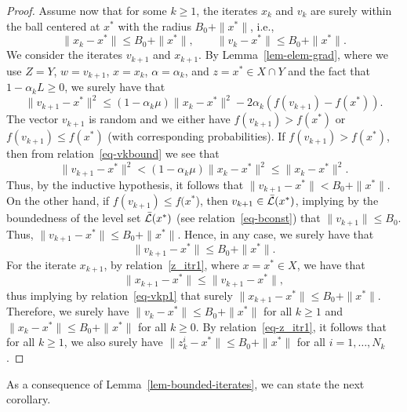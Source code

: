 \documentclass{article}
\def\a{\alpha}
\theoremstyle{plain}
\theoremstyle{definition}
\theoremstyle{remark}
\begin{document}
\begin{proof}
    Assume now that for some $k\ge 1$, the iterates $x_k$ and $v_k$ are surely within the ball centered at $x^*$ with the radius $B_0+\|x^*\|$, i.e.,
    \[\|x_k-x^*\|\le B_0+\|x^*\|,\qquad 
    \|v_k-x^*\|\le B_0+\|x^*\|.\]
    We consider the iterates $v_{k+1}$ and $x_{k+1}$.
    By Lemma~\ref{lem-elem-grad}, where we use 
    $Z=Y$, $w=v_{k+1}$, $x=x_k$, $\a=\a_k$, and $z=x^*\in X \cap Y $ and the fact that $1-\a_k L\ge0$, we surely have that 
    \begin{equation}\label{eq-vkbound}
    \|v_{k+1} - x^*\|^2 \leq (1-\a_k \mu) \| x_{k} -x^*\|^2  - 2 \a_k (f(v_{k+1}) - f(x^*)).
     \end{equation}
    The vector $v_{k+1}$ is random and we either have 
    $f(v_{k+1})> f(x^*)$ or $f(v_{k+1})\le f(x^*)$ (with corresponding probabilities).
    If $f(v_{k+1})> f(x^*)$, then 
    from relation~\eqref{eq-vkbound} we see that 
    \[\|v_{k+1} - x^*\|^2 <(1-\a_k \mu) \| x_{k} -x^*\|^2 \le \|x_k-x^*\|^2.\]
    Thus, by the inductive hypothesis, it follows that
    $\|v_{k+1}-x^*\|< B_0+\|x^*\|$. 
    On the other hand, 
    if $f(v_{k+1})\le f(x^*$), then $v_{k+1}\in {\cal \bar L}(x^*)$, implying by the boundedness of the level set ${\cal \bar L}(x^*)$ (see relation~\eqref{eq-bconst})  that 
    $\|v_{k+1}\|\le B_0$. Thus, $\|v_{k+1}-x^*\|\le B_0+\|x^*\|$.
    Hence, in any case,  we surely have that
    \begin{equation}\label{eq-vkp1}
    \|v_{k+1} - x^*\|\le B_0+\|x^*\|.
    \end{equation}
    For the iterate $x_{k+1}$, by relation~\eqref{z_itr1}, where $x=x^*\in X$, we have that 
    \[\|x_{k+1}-x^*\|\le \|v_{k+1}-x^*\|,\]
    thus implying by relation~\eqref{eq-vkp1} that surely $\|x_{k+1}-x^*\|\le B_0+\|x^*\|$.
    Therefore, we surely  have $\|v_k-x^*\|\le B_0+\|x^*\|$ for all $k\ge1$ and  $\|x_k-x^*\|\le B_0+\|x^*\|$ for all $k\ge0$. %
    By relation~\eqref{eq-z_itr1}, it follows that for all $k\ge1$, we also surely have
    $\|z_k^i-x^*\|\le B_0+\|x^*\|$ for all $i=1,\ldots, N_k$.
\end{proof}


As a consequence of Lemma~\ref{lem-bounded-iterates}, we can state the next corollary.
\end{document}
